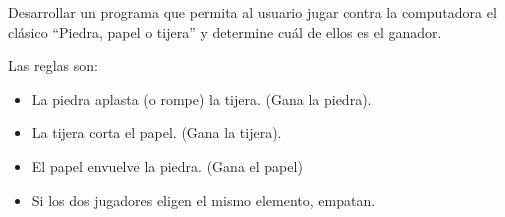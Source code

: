 Desarrollar un programa que permita al usuario jugar contra la computadora el clásico “Piedra, papel o tijera” y determine cuál de ellos es el ganador.

Las reglas son:

\begin{itemize}
	\item La piedra aplasta (o rompe) la tijera. (Gana la piedra).
	\item La tijera corta el papel. (Gana la tijera).
	\item El papel envuelve la piedra. (Gana el papel)
	\item Si los dos jugadores eligen el mismo elemento, empatan.
\end{itemize}
